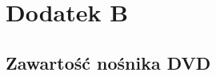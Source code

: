 \renewcommand{\figurename}{Rys.}

\chapter*{Dodatek B}
\label{cha:dodatekB}

\fontsize{14}{15}\selectfont
\section*{\LARGE Zawartość nośnika DVD}
\label{sec:Schematy}


